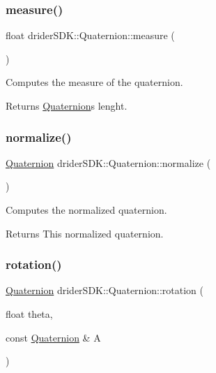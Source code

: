 \subsubsection{\texorpdfstring{measure()}{measure()}}
{\footnotesize\ttfamily float drider\+S\+D\+K\+::\+Quaternion\+::measure (\begin{DoxyParamCaption}{ }\end{DoxyParamCaption})}

Computes the measure of the quaternion.

\begin{DoxyReturn}{Returns}
\hyperlink{classdrider_s_d_k_1_1_quaternion}{Quaternion}\textquotesingle{}s lenght. 
\end{DoxyReturn}
\mbox{\label{classdrider_s_d_k_1_1_quaternion_afd671db56c3cd55b0d543e96b8e690ef}} 
\subsubsection{\texorpdfstring{normalize()}{normalize()}}
{\footnotesize\ttfamily \hyperlink{classdrider_s_d_k_1_1_quaternion}{Quaternion} drider\+S\+D\+K\+::\+Quaternion\+::normalize (\begin{DoxyParamCaption}{ }\end{DoxyParamCaption})}

Computes the normalized quaternion.

\begin{DoxyReturn}{Returns}
This normalized quaternion. 
\end{DoxyReturn}
\mbox{\label{classdrider_s_d_k_1_1_quaternion_a892aa4383f2070ef76b549705b8905cb}} 
\subsubsection{\texorpdfstring{rotation()}{rotation()}}
{\footnotesize\ttfamily \hyperlink{classdrider_s_d_k_1_1_quaternion}{Quaternion} drider\+S\+D\+K\+::\+Quaternion\+::rotation (\begin{DoxyParamCaption}\item[{float}]{theta,  }\item[{const \hyperlink{classdrider_s_d_k_1_1_quaternion}{Quaternion} \&}]{A }\end{DoxyParamCaption})}

